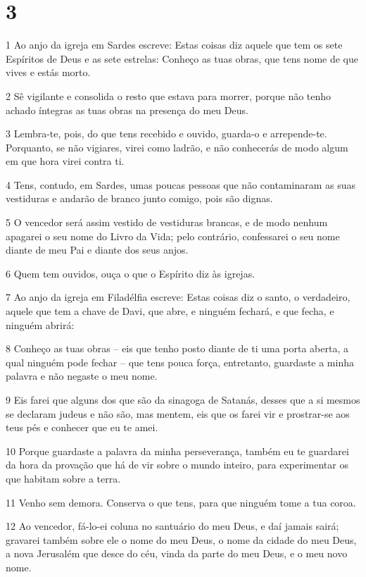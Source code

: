 \chapter{3}

\par 1 Ao anjo da igreja em Sardes escreve: Estas coisas diz aquele que tem os sete Espíritos de Deus e as sete estrelas: Conheço as tuas obras, que tens nome de que vives e estás morto.
\par 2 Sê vigilante e consolida o resto que estava para morrer, porque não tenho achado íntegras as tuas obras na presença do meu Deus.
\par 3 Lembra-te, pois, do que tens recebido e ouvido, guarda-o e arrepende-te. Porquanto, se não vigiares, virei como ladrão, e não conhecerás de modo algum em que hora virei contra ti.
\par 4 Tens, contudo, em Sardes, umas poucas pessoas que não contaminaram as suas vestiduras e andarão de branco junto comigo, pois são dignas.
\par 5 O vencedor será assim vestido de vestiduras brancas, e de modo nenhum apagarei o seu nome do Livro da Vida; pelo contrário, confessarei o seu nome diante de meu Pai e diante dos seus anjos.
\par 6 Quem tem ouvidos, ouça o que o Espírito diz às igrejas.
\par 7 Ao anjo da igreja em Filadélfia escreve: Estas coisas diz o santo, o verdadeiro, aquele que tem a chave de Davi, que abre, e ninguém fechará, e que fecha, e ninguém abrirá:
\par 8 Conheço as tuas obras -- eis que tenho posto diante de ti uma porta aberta, a qual ninguém pode fechar -- que tens pouca força, entretanto, guardaste a minha palavra e não negaste o meu nome.
\par 9 Eis farei que alguns dos que são da sinagoga de Satanás, desses que a si mesmos se declaram judeus e não são, mas mentem, eis que os farei vir e prostrar-se aos teus pés e conhecer que eu te amei.
\par 10 Porque guardaste a palavra da minha perseverança, também eu te guardarei da hora da provação que há de vir sobre o mundo inteiro, para experimentar os que habitam sobre a terra.
\par 11 Venho sem demora. Conserva o que tens, para que ninguém tome a tua coroa.
\par 12 Ao vencedor, fá-lo-ei coluna no santuário do meu Deus, e daí jamais sairá; gravarei também sobre ele o nome do meu Deus, o nome da cidade do meu Deus, a nova Jerusalém que desce do céu, vinda da parte do meu Deus, e o meu novo nome.
